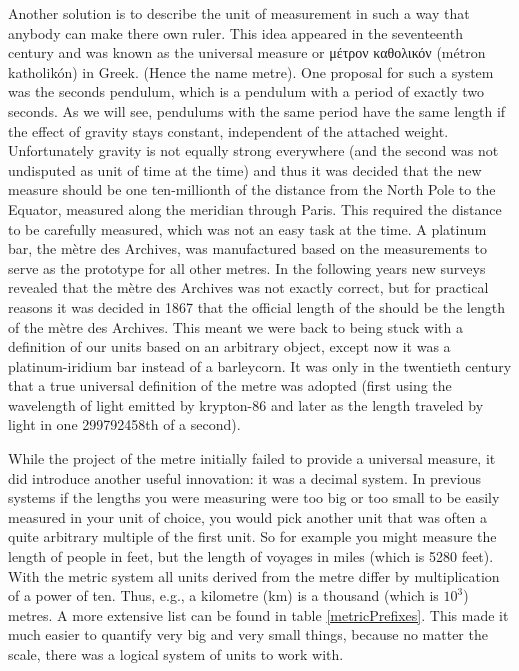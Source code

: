 \documentclass{report}
\begin{document}
Another solution is to describe the unit of measurement in such a way that anybody can make there own ruler. This idea appeared in the seventeenth century and was known as the universal measure or \textgreek{μέτρον καθολικόν} (métron katholikón) in Greek. (Hence the name metre).
One proposal for such a system was the seconds pendulum, which is a pendulum with a period of exactly two seconds. As we will see, pendulums with the same period have the same length if the effect of gravity stays constant, independent of the attached weight.
Unfortunately gravity is not equally strong everywhere (and the second was not undisputed as unit of time at the time) and thus it was decided that the new measure should be one ten-millionth of the distance from the North Pole to the Equator, measured along the meridian through Paris. This required the distance to be carefully measured, which was not an easy task at the time. A platinum bar, the mètre des Archives, was manufactured based on the measurements to serve as the prototype for all other metres. In the following years new surveys revealed that the mètre des Archives was not exactly correct, but for practical reasons it was decided in 1867 that the official length of the should be the length of the mètre des Archives. This meant we were back to being stuck with a definition of our units based on an arbitrary object, except now it was a platinum-iridium bar instead of a barleycorn. It was only in the twentieth century that a true universal definition of the metre was adopted (first using the wavelength of light emitted by krypton-86 and later as the length traveled by light in one 299792458th of a second).

While the project of the metre initially failed to provide a universal measure, it did introduce another useful innovation: it was a decimal system.
In previous systems if the lengths you were measuring were too big or too small to be easily measured in your unit of choice, you would pick another unit that was often a quite arbitrary multiple of the first unit.
So for example you might measure the length of people in feet, but the length of voyages in miles (which is 5280 feet). With the metric system all units derived from the metre differ by multiplication of a power of ten. Thus, e.g., a kilometre (km) is a thousand (which is $10^3$) metres. A more extensive list can be found in table \ref{metricPrefixes}. This made it much easier to quantify very big and very small things, because no matter the scale, there was a logical system of units to work with.
\end{document}
